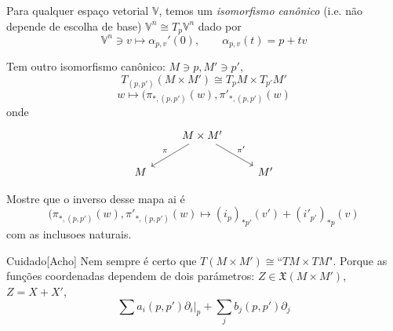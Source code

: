 \begin{remark}\leavevmode
Para qualquer espaço vetorial \(\mathbb{V}\), temos um \textit{isomorfismo canônico} (i.e. não depende de escolha de base) \(\mathbb{V}^n \cong T_p\mathbb{V}^n\) dado por
\[\mathbb{V}^n \ni v \longmapsto \alpha_{p,v}'(0),\qquad  \alpha_{p,v}(t)=p+tv\]

Tem outro isomorfismo canônico: \(M\ni p,M' \ni p'\),
\[T_{(p,p')}(M \times M') \cong T_pM \times T_{p'}M'\]
\[w \longmapsto(\pi_{*,(p,p')}(w),\pi'_{*,(p,p')}(w)\]
onde
\[\begin{tikzcd}
&M\times M'\arrow[dl,"\pi",swap]\arrow[dr,"\pi'"]\\
M&&M'
\end{tikzcd}\]
\begin{exercise}\leavevmode
Mostre que o inverso desse mapa ai é
\[(\pi_{*,(p,p')}(w),\pi'_{*,(p,p')}(w) \longmapsto(i_p)_{* p'}(v') + (i'_{p'})_{* p}(v)\]
com as inclusoes naturais.
\end{exercise}
\end{remark}

\begin{thing7}{Cuidado}[Acho]\leavevmode
Nem sempre é certo que \(T(M \times M') \cong \)``\(TM \times TM\)". Porque as funções coordenadas dependem de dois parámetros: \(Z \in \mathfrak{X}(M \times M')\), \(Z=X+X'\),
 \[\sum a_i(p,p')\partial_i|_{p}+\sum_{j}b_j(p,p') \partial_j\]
\end{thing7}

